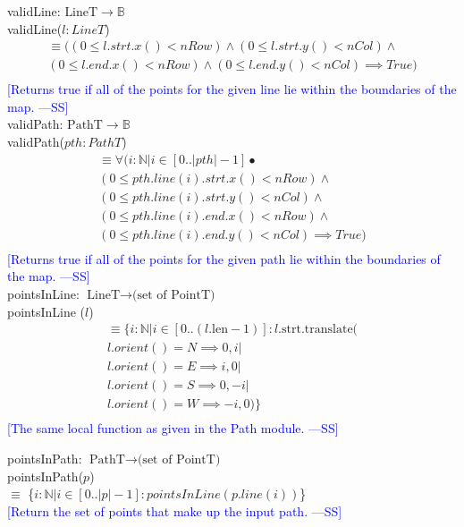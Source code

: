 \documentclass[12pt]{article}
\newcommand{\authornote}[3]{\textcolor{#1}{[#3 ---#2]}}
\newcommand{\authornote}[3]{}
\newcommand{\wss}[1]{\authornote{blue}{SS}{#1}}
\begin{document}
\noindent validLine: $\mbox{LineT} \rightarrow \mathbb{B}$\\
\noindent validLine($l:LineT$)\\
\begin{multline*}
\equiv ((0 \leq l.strt.x() < nRow) \land (0 \leq l.strt.y() < nCol) \land \\ (0 \leq l.end.x() < nRow) \land (0 \leq l.end.y() < nCol) \implies True)\\
\end{multline*}
\wss{Returns true if all of the points for the given line lie within the boundaries of the
  map.}\\

\noindent validPath: $\mbox{PathT} \rightarrow \mathbb{B}$\\
\noindent validPath($pth:PathT$)\\
\begin{multline*}
\equiv \forall(i:\mathbb{N}|i\in[0..|pth|-1] \bullet \\(0 \leq pth.line(i).strt.x() < nRow) \land \\ (0 \leq pth.line(i).strt.y() < nCol) \land \\(0 \leq pth.line(i).end.x() < nRow) \land \\ (0 \leq pth.line(i).end.y() < nCol) \implies True)\\
\end{multline*}
\wss{Returns true if all of the points for the given path lie within the boundaries of the
  map.}\\

\noindent pointsInLine: $\mbox{LineT} \rightarrow \mbox{(set of PointT)}$\\
\noindent pointsInLine ($l$) 
\begin{multline*}
\equiv \{ i: \mathbb{N} | i \in [0
  .. (l.\mbox{len} - 1)] : l.\mbox{strt}.\mbox{translate}(\\l.orient() = N \implies 0, i|\\
  l.orient() = E \implies i, 0|\\
  l.orient() = S \implies 0, -i|\\
  l.orient() = W \implies -i, 0)\}\\
\end{multline*}
\wss{The same local function as given in the Path module.}

\noindent pointsInPath: $\mbox{PathT} \rightarrow \mbox{(set of PointT)}$\\
\noindent pointsInPath($p$)\\
\indent $\equiv$ \{$i : \mathbb{N}|i\in[0..|p|-1]: pointsInLine(p.line(i))$\}\\
\wss{Return the set of points that make up the input path.}
\end{document}
